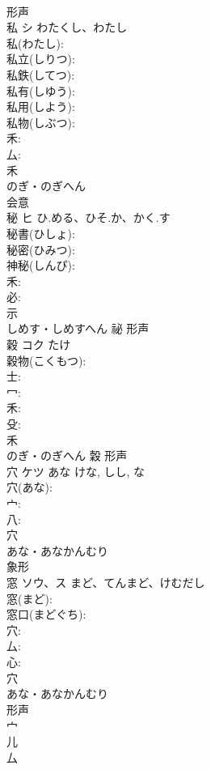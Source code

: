 \documentclass[8pt]{extreport}
\begin{document}
\begin{CJK}{UTF8}{min}
\\	形声 
\\	私	シ	わたくし、わたし		
\\	私(わたし): 
\\	私立(しりつ): 
\\	私鉄(してつ): 
\\	私有(しゆう): 
\\	私用(しよう): 
\\	私物(しぶつ): 
\\	禾: 
\\	厶: 
\\	禾	
\\	のぎ・のぎへん	
\\	会意 
\\	秘	ヒ	ひ.める、ひそ.か、かく.す		
\\	秘書(ひしょ): 
\\	秘密(ひみつ): 
\\	神秘(しんぴ): 
\\	禾: 
\\	必: 
\\	示	
\\	しめす・しめすへん	祕	形声 
\\	穀	コク		たけ	
\\	穀物(こくもつ): 
\\	士: 
\\	冖: 
\\	禾: 
\\	殳: 
\\	禾	
\\	のぎ・のぎへん	穀	形声 
\\	穴	ケツ	あな	けな, しし, な	
\\	穴(あな): 
\\	宀: 
\\	八: 
\\	穴	
\\	あな・あなかんむり	
\\	象形 
\\	窓	ソウ、ス	まど、てんまど、けむだし		
\\	窓(まど): 
\\	窓口(まどぐち): 
\\	穴: 
\\	厶: 
\\	心: 
\\	穴	
\\	あな・あなかんむり	
\\	形声 
\\	宀 
\\	儿 
\\	厶 

\end{CJK}
\end{document}
